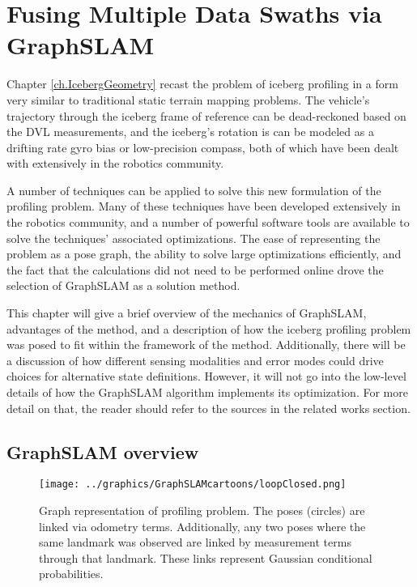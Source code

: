 
\chapter{Fusing Multiple Data Swaths via GraphSLAM}
\label{ch.GraphSLAM}

Chapter \ref{ch.IcebergGeometry} recast the problem of iceberg profiling in a form very similar to traditional static terrain mapping problems. The vehicle's trajectory through the iceberg frame of reference can be dead-reckoned based on the DVL measurements, and the iceberg's rotation is can be modeled as a drifting rate gyro bias or low-precision compass, both of which have been dealt with extensively in the robotics community.

A number of techniques can be applied to solve this new formulation of the profiling problem. Many of these techniques have been developed extensively in the robotics community, and a number of powerful software tools are available to solve the techniques' associated optimizations. The ease of representing the problem as a pose graph, the ability to solve large optimizations efficiently, and the fact that the calculations did not need to be performed online drove the selection of GraphSLAM as a solution method. 

This chapter will give a brief overview of the mechanics of GraphSLAM, advantages of the method, and a description of how the iceberg profiling problem was posed to fit within the framework of the method. Additionally, there will be a discussion of how different sensing modalities and error modes could drive choices for alternative state definitions. However, it will not go into the low-level details of how the GraphSLAM algorithm implements its optimization. For more detail on that, the reader should refer to the sources in the related works section.

\section{GraphSLAM overview}

\begin{figure}[htb]
   \centering
   \texttt{[image: ../graphics/GraphSLAMcartoons/loopClosed.png]} %
   \caption{Graph representation of profiling problem.  The poses (circles) are linked via odometry terms. Additionally, any two poses where the same landmark was observed are linked by measurement terms through that landmark. These links represent Gaussian conditional probabilities. }
   \label{fig:GraphSLAM}
\end{figure}

